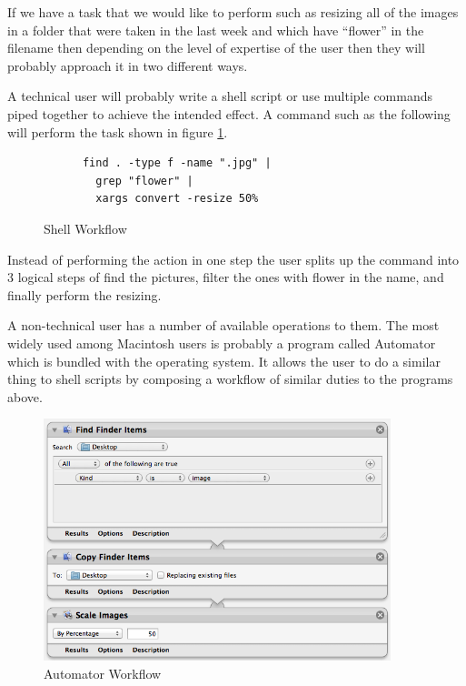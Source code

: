 If we have a task that we would like to perform such as resizing all of the images in a folder that were taken in the last week and which have ``flower'' in the filename then depending on the level of expertise of the user then they will probably approach it in two different ways.

A technical user will probably write a shell script or use multiple commands piped together to achieve the intended effect. A command such as the following will perform the task shown in figure \ref{fig:shell}.

\begin{figure}[ht!]
  \centering
	\begin{verbatim}
	  find . -type f -name ".jpg" |
	    grep "flower" |
	    xargs convert -resize 50%
	\end{verbatim}
  \caption{Shell Workflow}
  \label{fig:shell}
\end{figure}


Instead of performing the action in one step the user splits up the command into 3 logical steps of find the pictures, filter the ones with flower in the name, and finally perform the resizing.

A non-technical user has a number of available operations to them. The most widely used among Macintosh users is probably a program called Automator which is bundled with the operating system. It allows the user to do a similar thing to shell scripts by composing a workflow of similar duties to the programs above.

\begin{figure}[ht!]
  \centering
  \includegraphics[width=0.9\textwidth]{images/automator}
  \caption{Automator Workflow}
  \label{fig:automator}
\end{figure}

